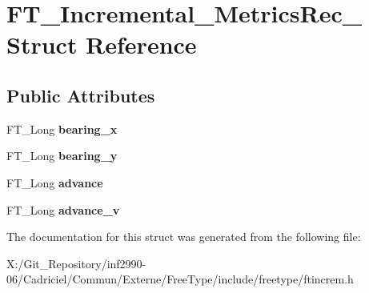 \hypertarget{struct_f_t___incremental___metrics_rec__}{\section{F\-T\-\_\-\-Incremental\-\_\-\-Metrics\-Rec\-\_\- Struct Reference}
\label{struct_f_t___incremental___metrics_rec__}
}
\subsection*{Public Attributes}
\begin{DoxyCompactItemize}
\item 
\hypertarget{struct_f_t___incremental___metrics_rec___af065d998d0a0f2a57513125038d802a6}{F\-T\-\_\-\-Long {\bfseries bearing\-\_\-x}}\label{struct_f_t___incremental___metrics_rec___af065d998d0a0f2a57513125038d802a6}

\item 
\hypertarget{struct_f_t___incremental___metrics_rec___af1443aa7c1ca54d3c2a29f1cf6d7848b}{F\-T\-\_\-\-Long {\bfseries bearing\-\_\-y}}\label{struct_f_t___incremental___metrics_rec___af1443aa7c1ca54d3c2a29f1cf6d7848b}

\item 
\hypertarget{struct_f_t___incremental___metrics_rec___a996c99aa0e6b36c2c7776fc1a2b6b614}{F\-T\-\_\-\-Long {\bfseries advance}}\label{struct_f_t___incremental___metrics_rec___a996c99aa0e6b36c2c7776fc1a2b6b614}

\item 
\hypertarget{struct_f_t___incremental___metrics_rec___a0ee280662a03ea935dbfe377e56f4d6d}{F\-T\-\_\-\-Long {\bfseries advance\-\_\-v}}\label{struct_f_t___incremental___metrics_rec___a0ee280662a03ea935dbfe377e56f4d6d}

\end{DoxyCompactItemize}


The documentation for this struct was generated from the following file\-:\begin{DoxyCompactItemize}
\item 
X\-:/\-Git\-\_\-\-Repository/inf2990-\/06/\-Cadriciel/\-Commun/\-Externe/\-Free\-Type/include/freetype/ftincrem.\-h\end{DoxyCompactItemize}
